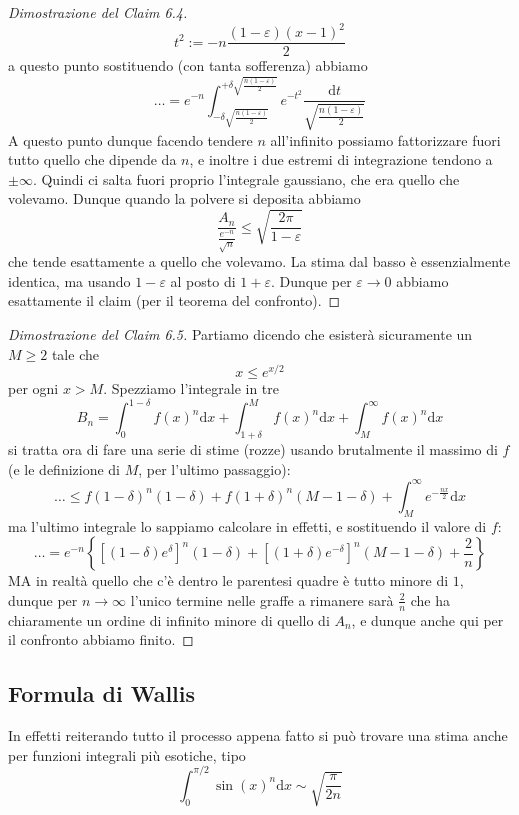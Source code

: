 \documentclass[11pt]{scrartcl}
\begin{document}
\begin{proof}[Dimostrazione del Claim 6.4]
  	$$t^2:=-n\frac{(1-\varepsilon)(x-1)^2}{2}$$
  	a questo punto sostituendo (con tanta sofferenza) abbiamo
  	$$\dots = e^{-n}\int_{-\delta \sqrt{\frac{n(1-\varepsilon)}{2}}}^{+\delta \sqrt{\frac{n(1-\varepsilon)}{2}}}e^{-t^2}\frac{\text{d}t}{\sqrt{\frac{n(1-\varepsilon)}{2}}}$$ 
  	A questo punto dunque facendo tendere $n$ all'infinito possiamo fattorizzare fuori tutto quello che dipende da $n$, e inoltre i due estremi di integrazione tendono a $\pm\infty$. Quindi ci salta fuori proprio l'integrale gaussiano, che era quello che volevamo. Dunque quando la polvere si deposita abbiamo
  	$$\frac{A_n}{\frac{e^{-n}}{\sqrt{n}}}\le \sqrt{\frac{2\pi}{1-\varepsilon}}$$
  	che tende esattamente a quello che volevamo. La stima dal basso è essenzialmente identica, ma usando $1-\varepsilon$ al posto di $1+\varepsilon$. Dunque per $\varepsilon\to 0$ abbiamo esattamente il claim (per il teorema del confronto).
  \end{proof}
  \begin{proof}[Dimostrazione del Claim 6.5]
  	Partiamo dicendo che esisterà sicuramente un $M\ge 2$ tale che 
  	$$x\le e^{x/2}$$
  	per ogni $x>M$. Spezziamo l'integrale in tre
  	$$B_n=\int_{0}^{1-\delta}f(x)^n\text{d}x+\int_{1+\delta}^{M}f(x)^n\text{d}x+\int_{M}^{\infty}f(x)^n\text{d}x$$
  	si tratta ora di fare una serie di stime (rozze) usando brutalmente il massimo di $f$ (e le definizione di $M$, per l'ultimo passaggio):
  	$$\dots\le f(1-\delta)^n(1-\delta)+f(1+\delta)^n(M-1-\delta)+\int_{M}^{\infty}e^{-\frac{nx}{2}}\text{d}x$$
  	ma l'ultimo integrale lo sappiamo calcolare in effetti, e sostituendo il valore di $f$:
  	$$\dots=e^{-n}\left\{\left[(1-\delta)e^\delta\right]^n(1-\delta)+\left[(1+\delta)e^{-\delta}\right]^n(M-1-\delta)+\frac{2}{n}\right\}$$
  	MA in realtà quello che c'è dentro le parentesi quadre è tutto minore di $1$, dunque per $n\to\infty$ l'unico termine nelle graffe a rimanere sarà $\frac{2}{n}$ che ha chiaramente un ordine di infinito minore di quello di $A_n$, e dunque anche qui per il confronto abbiamo finito. 
  \end{proof}
  \subsection{Formula di Wallis}
  In effetti reiterando tutto il processo appena fatto si può trovare una stima anche per funzioni integrali più esotiche, tipo
  $$\int_0^{\pi/2}\sin(x)^n\text{d}x\sim \sqrt{\frac{\pi}{2n}}$$
  
  \newpage
  
\end{document}
